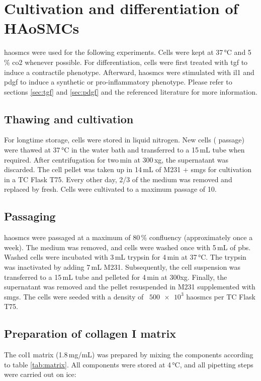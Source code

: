 \section{Cultivation and differentiation of HAoSMCs}
\label{sec:cultivation}
\Acp{haosmc} were used for the following experiments. Cells were kept at 37\,°C and 5\,\% \ac{co2} whenever possible. For differentiation, cells were first treated with \ac{tgf} to induce a contractile phenotype. Afterward, \acp{haosmc} were stimulated with \acf{il1} and \ac{pdgf} to induce a synthetic or pro-inflammatory phenotype. Please refer to sections \ref{sec:tgf} and \ref{sec:pdgf} and the referenced literature for more information.

    \subsection{Thawing and cultivation}
    For longtime storage, cells were stored in liquid nitrogen. New cells ( passage) were thawed at 37\,°C in the water bath and transferred to a 15\,mL tube when required. After centrifugation for two\,min at 300\,xg, the supernatant was discarded. The cell pellet was taken up in 14\,mL of \acf{M231} + \ac{smgs} for cultivation in a TC Flask T75. Every other day, 2/3 of the medium was removed and replaced by fresh. Cells were cultivated to a maximum passage of 10.

    \subsection{Passaging}
    \acp{haosmc} were passaged at a maximum of 80\,\% confluency (approximately once a week). The medium was removed, and cells were washed once with 5\,mL of \ac{pbs}. Washed cells were incubated with 3\,mL trypsin for 4\,min at 37\,°C. The trypsin was inactivated by adding 7\,mL \ac{M231}. Subsequently, the cell suspension was transferred to a 15\,mL tube and pelleted for 4\,min at 300xg. Finally, the supernatant was removed and the pellet resuspended in \ac{M231} supplemented with \ac{smgs}. The cells were seeded with a density of ~$\num{500e3}$ \acp{haosmc} per TC Flask T75.

    \subsection{Preparation of collagen I matrix}
    \label{subsec:matrix}
    The \ac{col1} matrix (1.8\,mg/mL) was prepared by mixing the components according to table \ref{tab:matrix}. All components were stored at 4\,°C, and all pipetting steps were carried out on ice:

